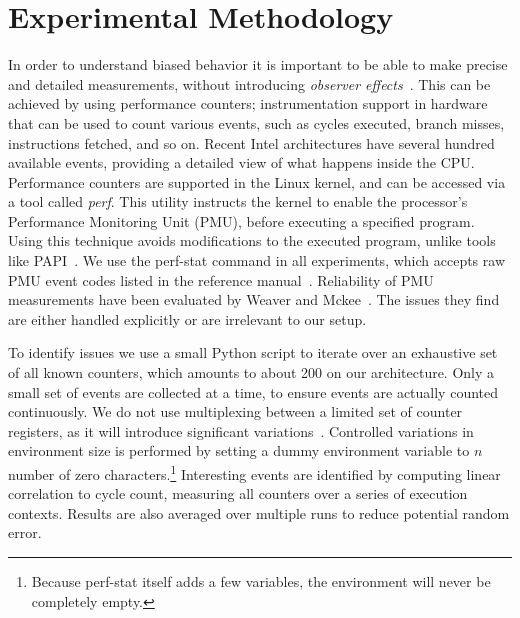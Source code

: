 \documentclass[10pt, conference, compsocconf]{IEEEtran}
\begin{document}
\section{Experimental Methodology}
\label{sec:methodology}
In order to understand biased behavior it is important to be able to make precise and detailed measurements, without introducing \emph{observer effects}~\cite{Mytkowicz:2008:OE&MB}.
This can be achieved by using performance counters; instrumentation support in hardware that can be used to count various events, such as cycles executed, branch misses, instructions fetched, and so on.
Recent Intel architectures have several hundred available events, providing a detailed view of what happens inside the CPU.
Performance counters are supported in the Linux kernel, and can be accessed via a tool called \emph{perf}.
This utility instructs the kernel to enable the processor's Performance Monitoring Unit (PMU), before executing a specified program.
Using this technique avoids modifications to the executed program, unlike tools like PAPI~\cite{PAPI:PortableInterface}.
We use the perf-stat command in all experiments, which accepts raw PMU event codes listed in the reference manual~\cite{Volume3B}.
Reliability of PMU measurements have been evaluated by Weaver and Mckee~\cite{Weaver:2008:PCTrusted}.
The issues they find are either handled explicitly or are irrelevant to our setup.

To identify issues we use a small Python script to iterate over an exhaustive set of all known counters, which amounts to about 200 on our architecture.
Only a small set of events are collected at a time, to ensure events are actually counted continuously.
We do not use multiplexing between a limited set of counter registers, as it will introduce significant variations~\cite{Wiplove:ImproveEstimation}. %
Controlled variations in environment size is performed by setting a dummy environment variable to $n$ number of zero characters.\footnote{Because perf-stat itself adds a few variables, the environment will never be completely empty.}
Interesting events are identified by computing linear correlation to cycle count, measuring all counters over a series of execution contexts.
Results are also averaged over multiple runs to reduce potential random error.%
\end{document}
